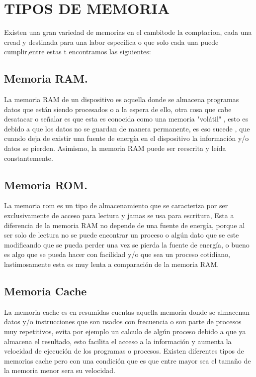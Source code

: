 \documentclass{article}
\begin{document}
\section{TIPOS DE MEMORIA} \label{contenido}
Existen una gran variedad de memorias  en el cambitode la comptacion, cada una cread y destinada para una labor especifica o que solo cada una puede cumplir,entre estas t encontramos las siguientes: \cite{Augusto}
\subsection{Memoria RAM.}
La memoria RAM  de un dispositivo  es aquella donde se almacena programas datos que están siendo procesados o a la espera de ello, otra cosa que cabe desatacar o señalar es que  esta es conocida como una  memoria "volátil" , esto es debido a que los datos no se guardan de manera permanente, es eso sucede , que cuando deja de existir una fuente de energía en el dispositivo la información y/o datos se pierden. Asimismo, la memoria RAM puede ser reescrita y leída constantemente. \cite{RAM}


\subsection{Memoria ROM.}
La memoria rom es un tipo de almacenamiento que se caracteriza por ser exclusivamente de acceso para lectura y jamas se usa para escritura, Esta a diferencia de la memoria RAM no depende de una fuente de energía, porque al ser solo de lectura no se puede encontrar un proceso o algún dato que se este modificando que se pueda perder una vez se pierda la fuente de energía, o bueno es algo que se pueda hacer con facilidad y/o que sea un proceso cotidiano, lastimosamente esta es muy lenta a comparación de la memoria RAM. \cite{ROM}

\subsection {Memoria Cache}
La memoria cache es en resumidas cuentas aquella memoria donde se almacenan datos y/o instrucciones que son usados con frecuencia o son parte de procesos muy repetitivos, evita por ejemplo un calculo de algún proceso debido a que ya almacena el resultado, esto facilita el acceso a la información y aumenta la velocidad de ejecución de los programas o procesos.
Existen diferentes tipos de memorias cache pero con una condición que es que entre mayor sea el tamaño de la memoria menor sera su velocidad.
\end{document}
